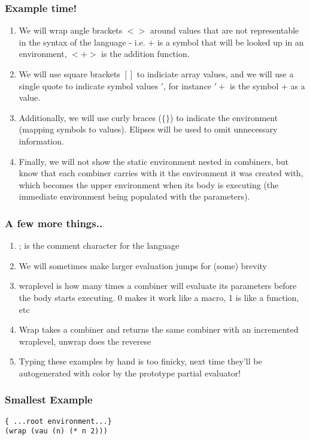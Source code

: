 \documentclass{beamer}
\begin{document}
\begin{frame}[fragile]
\frametitle{Example time!}
  \begin{enumerate}
    \item<1-> We will wrap angle brackets $<>$ around values that are not representable in the syntax of the language - i.e. $+$ is a symbol that will be looked up in an environment, $<+>$ is the addition function.
    \item<2->  We will use square brackets $[]$ to indiciate array values, and we will use a single quote to indicate symbol values $'$, for instance $'+$ is the symbol $+$ as a value.
	\item<3-> Additionally, we will use curly braces ($\{\}$) to indicate the environment (mapping symbols to values). Elipses will be used to omit unnecessary information.
	\item<4-> Finally, we will not show the static environment nested in combiners, but know that each combiner carries with it the environment it was created with, which becomes the upper environment when its body is executing (the immediate environment being populated with the parameters).
  \end{enumerate}
\end{frame}

\begin{frame}[fragile]
\frametitle{A few more things..}
  \begin{enumerate}
    \item<1-> ; is the comment character for the language
	\item<2-> We will sometimes make larger evaluation jumps for (some) brevity
	\item<3-> wraplevel is how many times a combiner will evaluate its parameters before the body starts executing. 0 makes it work like a macro, 1 is like a function, etc
	\item<4-> Wrap takes a combiner and returns the same combiner with an incremented wraplevel, unwrap does the reverese
	\item<5-> Typing these examples by hand is too finicky, next time they'll be autogenerated with color by the prototype partial evaluator!
  \end{enumerate}
\end{frame}

\begin{frame}[fragile]
\frametitle{Smallest Example}
\footnotesize
\begin{verbatim}
{ ...root environment...}
(wrap (vau (n) (* n 2)))
\end{verbatim}
\end{frame}
\end{document}
